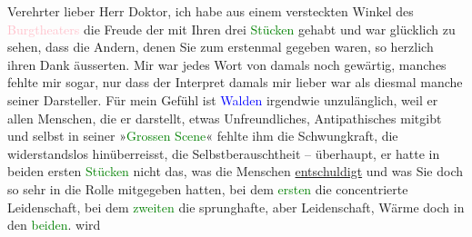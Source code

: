 \pstart
           Verehrter lieber Herr Doktor, ich habe \label{K_L03655-1v}\label{K_L03655-1h} aus einem
               versteckten Winkel des \textcolor{pink}{Burgtheaters}{}\ledrightnote{\textcolor{pink}{Burgtheater}} die Freude der
                  \label{K_L03655-2v}\label{K_L03655-2h} mit Ihren drei \textcolor{green}{Stücken}{}\ledrightnote{{$\rightarrow$}\textcolor{green}{Komödie der Worte. Drei Einakter}} gehabt und war glücklich zu sehen, dass die Andern,
               denen Sie zum erstenmal gegeben waren, so herzlich ihren Dank äusserten. Mir war
               jedes Wort von damals noch gewärtig, manches fehlte mir sogar, nur dass der Interpret
               damals mir lieber war als diesmal manche seiner Darsteller. Für mein Gefühl ist \textcolor{blue}{Walden}{}\ledrightnote{\textcolor{blue}{Harry Walden}} irgendwie unzulänglich, weil er allen
               Menschen, die er darstellt, etwas Unfreundliches, Antipathisches mitgibt und {\pb}selbst in seiner »\textcolor{green}{Grossen Scene}{}\ledrightnote{\textcolor{green}{Große Szene}}« fehlte ihm die Schwungkraft, die
               widerstandslos hinüberreisst, die Selbstberauschtheit – überhaupt, er hatte in beiden
               ersten \textcolor{green}{Stücken}{}\ledrightnote{{$\rightarrow$}\textcolor{green}{Stunde des Erkennens}{\newline}{$\rightarrow$}\textcolor{green}{Große Szene}} nicht
               das, was die Menschen \uline{entschuldigt}\strikeout{, \textcolor{gray}{Fü}\textcolor{gray}{×}} und was Sie doch so sehr in die Rolle mitgegeben hatten,
               bei dem \textcolor{green}{ersten}{}\ledrightnote{{$\rightarrow$}\textcolor{green}{Stunde des Erkennens}{\newline}{$\rightarrow$}\textcolor{green}{Große Szene}} die
               concentrierte Leidenschaft, bei dem \textcolor{green}{zweiten}{}\ledrightnote{{$\rightarrow$}\textcolor{green}{Große Szene}} die sprunghafte, aber Leidenschaft, Wärme doch in den \textcolor{green}{beiden}{}\ledrightnote{{$\rightarrow$}\textcolor{green}{Stunde des Erkennens}{\newline}{$\rightarrow$}\textcolor{green}{Große Szene}}. \label{K_L03655-3v}\label{K_L03655-3h} wird
